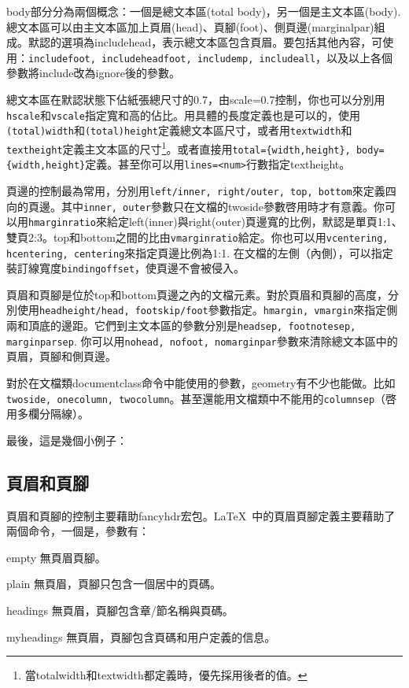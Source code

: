 body部分分為兩個概念：一個是總文本區(total body)，另一個是主文本區(body). 總文本區可以由主文本區加上頁眉(head)、頁腳(foot)、側頁邊(marginalpar)組成。默認的選項為includehead，表示總文本區包含頁眉。要包括其他內容，可使用：\texttt{includefoot, includeheadfoot, includemp, includeall}，以及以上各個參數將include改為ignore後的參數。

總文本區在默認狀態下佔紙張總尺寸的0.7，由scale=0.7控制，你也可以分別用\texttt{hscale}和\texttt{vscale}指定寬和高的佔比。用具體的長度定義也是可以的，使用\texttt{(total)width}和\texttt{(total)height}定義總文本區尺寸，或者用\texttt{textwidth}和\texttt{textheight}定義主文本區的尺寸\footnote{當totalwidth和textwidth都定義時，優先採用後者的值。}。或者直接用\texttt{total=\{width,height\}, body=\{width,height\}}定義。甚至你可以用\texttt{lines=<num>}行數指定textheight。

頁邊的控制最為常用，分別用\texttt{left/inner, right/outer, top, bottom}來定義四向的頁邊。其中\texttt{inner, outer}參數只在文檔的twoside參數啓用時才有意義。你可以用\texttt{hmarginratio}來給定left(inner)與right(outer)頁邊寬的比例，默認是單頁1:1、雙頁2:3。top和bottom之間的比由\texttt{vmarginratio}給定。你也可以用\texttt{vcentering, hcentering, centering}來指定頁邊比例為1:1. 在文檔的左側（內側），可以指定裝訂線寬度\texttt{bindingoffset}，使頁邊不會被侵入。

頁眉和頁腳是位於top和bottom頁邊之內的文檔元素。對於頁眉和頁腳的高度，分別使用\texttt{headheight/head, footskip/foot}參數指定。\texttt{hmargin, vmargin}來指定側兩和頂底的邊距。它們到主文本區的參數分別是\texttt{headsep, footnotesep, marginparsep}. 你可以用\texttt{nohead, nofoot, nomarginpar}參數來清除總文本區中的頁眉，頁腳和側頁邊。

對於在文檔類documentclass命令中能使用的參數，geometry有不少也能做。比如\texttt{twoside, onecolumn, twocolumn}。甚至還能用文檔類中不能用的\texttt{columnsep}（啓用多欄分隔線）。

最後，這是幾個小例子：
\begin{latex}
\usepackage[hmargin=1.25in,vmargin=1in]{geometry}
\usepackage[inner=1in,outer=1.25in]{geometry}
\end{latex}

\subsection{頁眉和頁腳}
頁眉和頁腳的控制主要藉助fancyhdr宏包。\LaTeX\ 中的頁眉頁腳定義主要藉助了兩個命令，一個是，參數有：
\begin{para}
\item[empty] 無頁眉頁腳。
\item[plain] 無頁眉，頁腳只包含一個居中的頁碼。
\item[headings] 無頁眉，頁腳包含章/節名稱與頁碼。
\item[myheadings] 無頁眉，頁腳包含頁碼和用户定義的信息。
\end{para}

